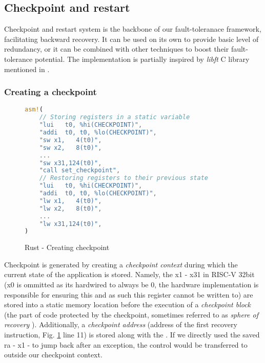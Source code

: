 \subsection{Checkpoint and restart}

Checkpoint and restart system is the backbone of our fault-toleranace framework, facilitating backward recovery. It can be used on its own to provide basic level of redundancy, or it can be combined with other techniques to boost their fault-tolerance potential. The implementation is partially inspired by \textit{libft} C library mentioned in \cite{libft}.

\subsubsection{Creating a checkpoint} \label{sec:creating_checkpoint}

\begin{figure}[!h]
\begin{lstlisting}[language=Rust]
asm!(
    // Storing registers in a static variable
    "lui   t0, %hi(CHECKPOINT)",
    "addi  t0, t0, %lo(CHECKPOINT)",
    "sw x1,   4(t0)",
    "sw x2,   8(t0)",
    ...
    "sw x31,124(t0)",
    "call set_checkpoint",
    // Restoring registers to their previous state
    "lui   t0, %hi(CHECKPOINT)",
    "addi  t0, t0, %lo(CHECKPOINT)",
    "lw x1,   4(t0)",
    "lw x2,   8(t0)",
    ...
    "lw x31,124(t0)",
)
\end{lstlisting}
\caption{Rust - Creating checkpoint}
\label{fig:rust_create_checkpoint}
\end{figure}

Checkpoint is generated by creating a \textit{checkpoint context} during which the current state of the application is stored. Namely, the  x1 - x31 in RISC-V 32bit (x0 is ommitted as its hardwired to always be 0, the hardware implementation is responsible for ensuring this and as such this register cannot be written to) are stored into a static memory location before the execution of a \textit{checkpoint block} (the part of code protected by the checkpoint, sometimes referred to as \textit{sphere of recovery} \cite{shubu}). Additionally, a \textit{checkpoint address} (address of the first recovery instruction, Fig. \ref{fig:rust_create_checkpoint} line 11) is stored along with the . If we directly used the saved \acrfull{ra} - x1 - to jump back after an exception, the control would be transferred to outside our checkpoint context.

